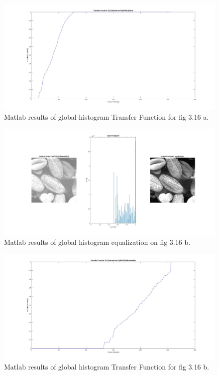 \documentclass[./rarnold_report2.tex]{subfiles}
\begin{document}
\begin{enumerate}[a.]
	\begin{figure}[!htbp]
	\centering
	\includegraphics[scale=0.25]{"transfer1"}
	\caption{Matlab results of global histogram Transfer Function for fig 3.16 a.} 
	\label{Tr1}
	\end{figure}
	
	\begin{figure}[!htbp]
	\centering
	\includegraphics[scale=0.25]{"histo2"}
	\caption{Matlab results of global histogram equalization on fig 3.16 b.} 
	\label{histo2}
	\end{figure}
	
	\begin{figure}[!htbp]
	\centering
	\includegraphics[scale=0.25]{"transfer2"}
	\caption{Matlab results of global histogram Transfer Function for fig 3.16 b.} 
	\label{Tr2}
	\end{figure}
	

\end{enumerate}
\end{document}
